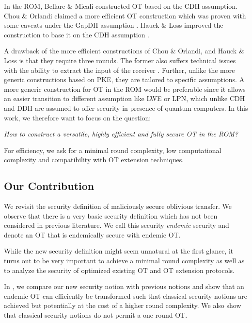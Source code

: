 In the ROM, Bellare \& Micali \cite{C:BelMic89} constructed OT based on the CDH assumption. Chou \& Orlandi \cite{LC:ChoOrl15} claimed a more efficient OT construction which was proven with some caveats under the GapDH assumption \cite{cryptoeprint:2017:1011}. Hauck \& Loss improved the construction to base it on the CDH assumption \cite{cryptoeprint:2017:1011}.

A drawback of the more efficient constructions of Chou \& Orlandi, and Hauck \& Loss is that they require three rounds. The former also suffers technical issues with the ability to extract the input of the receiver \cite{LC:ChoOrl15}. Further, unlike the more generic constructions based on PKE, they are tailored to specific assumptions. A more generic construction for OT in the ROM would be preferable since it allows an easier transition to different assumption like LWE or LPN, which unlike CDH and DDH are assumed to offer security in presence of quantum computers. In this work, we therefore want to focus on the question:

\begin{center}
\emph{How to construct a versatile, highly efficient and fully secure OT in the ROM?}
\end{center}

For efficiency, we ask for a minimal round complexity, low computational complexity and compatibility with OT extension techniques.

\subsection{Our Contribution}

We revisit the security definition of maliciously secure oblivious transfer. We observe that there is a very basic security definition which has not been considered in previous literature. We call this security \emph{endemic} security and denote an OT that is endemically secure with endemic OT. 

While the new security definition might seem unnatural at the first glance, it turns out to be very important to achieve a minimal round complexity as well as to analyze the security of optimized existing OT and OT extension protocols.

In , we compare our new security notion with previous notions and show that an endemic OT can efficiently  be transformed such that classical security notions are achieved but potentially at the cost of a higher round complexity. We also show that classical security notions do not permit a one round OT.

